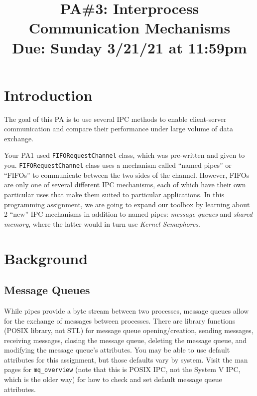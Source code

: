 \documentclass[12pt]{extarticle}
\newcommand{\duedate}{Sunday 3/21/21 at 11:59pm}
\begin{document}
\title{\vspace{-2.0cm}PA\#3: Interprocess Communication Mechanisms\small{\\Due: \duedate}}
\date{\vspace{-10ex}}
\maketitle

\section*{Introduction}
The goal of this PA is to use several IPC methods to enable client-server communication and compare their performance under large volume of data exchange. 

Your PA1 used \texttt{FIFORequestChannel} class, which was pre-written and given to you. \texttt{FIFORequestChannel} class uses a mechanism called ``named pipes'' or ``FIFOs'' to communicate between the two sides of the channel. However, FIFOs are only one of several different IPC mechanisms, each of which have their own particular uses that make them suited to particular applications. In this programming assignment, we are going to expand our toolbox by learning about 2 ``new'' IPC mechanisms in addition to named pipes: \emph{message queues} and \emph{shared memory}, where the latter would in turn use \emph{Kernel Semaphores}.

\section*{Background}
\subsection*{Message Queues}
While pipes provide a byte stream between two processes, message queues allow for the exchange of messages between processes. There are library functions (POSIX library, not STL) for message queue opening/creation, sending messages, receiving messages, closing the message queue, deleting the message queue, and modifying the message queue’s attributes. You may be able to use default attributes for this assignment, but those defaults vary by system. Visit the man pages for \texttt{mq\_overview} (note that this is POSIX IPC, not the System V IPC, which is the older way) for how to check and set default message queue attributes.
\end{document}

